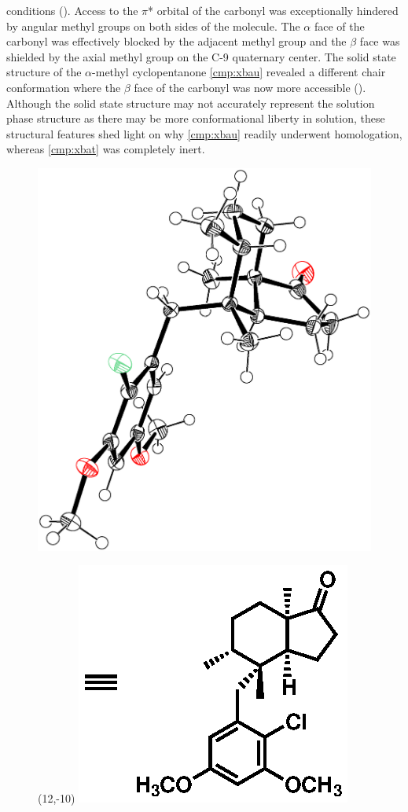 conditions (). Access to the $\pi$* orbital of the carbonyl was
exceptionally hindered by angular methyl groups on both sides of the molecule. The $\alpha$ face of the carbonyl was
effectively blocked by the adjacent methyl group and the $\beta$ face was shielded by the axial
methyl group on the C-9 quaternary center. The solid state structure of the $\alpha$-methyl
cyclopentanone \ref{cmp:xbau} revealed a different chair conformation where the $\beta$ face of the
carbonyl was now more accessible ().  Although the solid state structure may not
accurately represent the solution phase structure as there may be more conformational liberty in
solution, these structural features shed light on why \ref{cmp:xbau} readily underwent
homologation, whereas \ref{cmp:xbat} was completely inert.
 \begin{figure}[h]
  \centering
  \includegraphics[scale=0.40, trim = 10mm -50mm 15mm 0mm,
clip,
  angle=92]{chp_singlecarbon/images/alphamethylcrystal}
  \begin{textblock}{1}(12,-10)
  \includegraphics[scale=0.8]{chp_singlecarbon/images/alphamethylstructure}

\end{textblock}
\end{figure}
